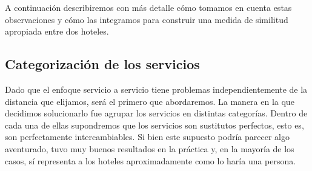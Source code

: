 \documentclass[12pt]{report}
\begin{document}
A continuación describiremos con más detalle cómo tomamos en cuenta estas observaciones y cómo las integramos para construir una medida de similitud apropiada entre dos hoteles.

\subsection*{Categorización de los servicios}

Dado que el enfoque servicio a servicio tiene problemas independientemente de la distancia que elijamos, será el primero que abordaremos. La manera en la que decidimos solucionarlo fue agrupar los servicios en distintas categorías. Dentro de cada una de ellas supondremos que los servicios son sustitutos perfectos, esto es, son perfectamente intercambiables. Si bien este supuesto podría parecer algo aventurado, tuvo muy buenos resultados en la práctica y, en la mayoría de los casos, sí representa a los hoteles aproximadamente como lo haría una persona.
\end{document}
